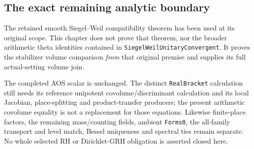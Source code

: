 \subsection{The exact remaining analytic boundary}

The retained smooth Siegel--Weil compatibility theorem has been
used at its original scope.  This chapter does not prove that
theorem, nor the broader arithmetic theta identities contained in
\texttt{SiegelWeilUnitaryConvergent}.  It proves the stabilizer
volume comparison \emph{from} that original premise and supplies
its full actual-setting volume join.

The completed AOS scalar is unchanged.  The distinct
\texttt{RealBracket} calculation still needs its reference
unipotent covolume/discriminant calculation and its local
Jacobian, place-splitting and product-transfer producers; the
present arithmetic covolume equality is not a replacement for
those equations.  Likewise finite-place factors, the remaining
mass/counting fields, ambient \texttt{Forms0}, the all-family
transport and level match, Bessel uniqueness and spectral ties
remain separate.  No whole selected RH or Dirichlet-GRH
obligation is asserted closed here.
